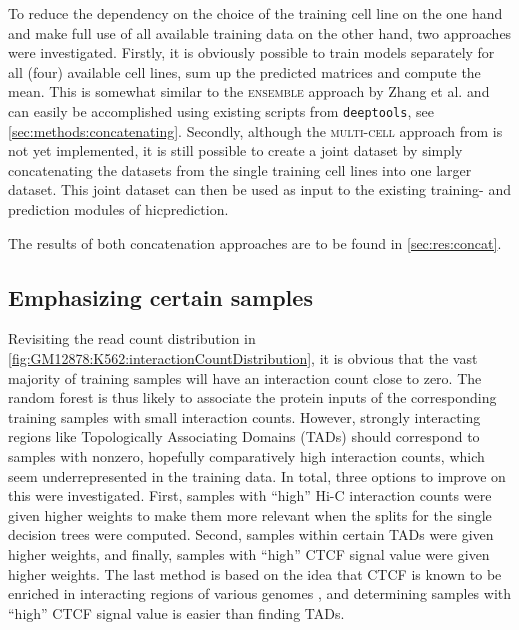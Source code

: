 To reduce the dependency on the choice of the training cell line on the one hand 
and make full use of all available training data on the other hand,
two approaches were investigated.
Firstly, it is obviously possible to train models separately for all (four)
available cell lines, sum up the predicted matrices and compute the mean.
This is somewhat similar to the \textsc{ensemble} approach by Zhang et al. \cite{Zhang2019}
and can easily be accomplished using existing scripts from \texttt{deeptools}, see \autoref{sec:methods:concatenating}.
Secondly, although the \textsc{multi-cell} approach from \cite{Zhang2019} is not yet implemented,
it is still possible to create a joint dataset by simply concatenating the datasets from the single training 
cell lines into one larger dataset.
This joint dataset can then be used as input to the existing training- and prediction modules of hicprediction.

The results of both concatenation approaches are to be found in \autoref{sec:res:concat}.

\subsection{Emphasizing certain samples}
Revisiting the read count distribution in \autoref{fig:GM12878:K562:interactionCountDistribution},
it is obvious that the vast majority of training samples
will have an interaction count close to zero. 
The random forest is thus likely to associate the protein inputs of the corresponding training samples
with small interaction counts.
However, strongly interacting regions like Topologically Associating Domains (TADs) should correspond to samples with nonzero, 
hopefully comparatively high interaction counts, which seem underrepresented in the training data.
In total, three options to improve on this were investigated.
First, samples with ``high'' Hi-C interaction counts were given higher weights
to make them more relevant when the splits for the single decision trees were computed.
Second, samples within certain TADs were given higher weights, and finally, 
samples with ``high'' CTCF signal value were given higher weights.
The last method is based on the idea that CTCF is known to be enriched in interacting regions of various genomes \cite{Lee2012, Holwerda2013, Tang2015},
and determining samples with ``high'' CTCF signal value is easier than finding TADs.

